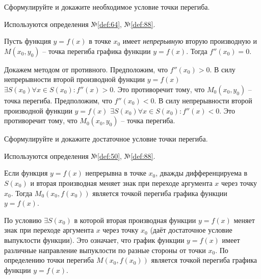 \begin{question}
    Сформулируйте и докажите необходимое условие точки перегиба.
\end{question}
\begin{used}
    Используются определения №\ref{def:64}, №\ref{def:88}.
\end{used}
\begin{theorem}
    Пусть функция $y = f(x)$ в точке $x_0$ имеет \textit{непрерывную} вторую производную и $M(x_0, y_0)$ -- точка перегиба графика функции $y = f(x)$. Тогда $f''(x_0) = 0$.
\end{theorem}
\begin{necessity}
    Докажем методом от противного. 
    Предположим, что $f''(x_0) > 0$. В силу непрерывности второй производной функции  $y = f(x)$ $\exists  S(x_0) \forall  x \in S(x_0) : f''(x) > 0$. Это противоречит тому, что $M_0(x_0, y_0)$ -- точка перегиба.
    Предположим, что $f''(x_0) < 0$. В силу непрерывности второй производной функции  $y = f(x)$ $\exists  S(x_0) \forall  x \in S(x_0) : f''(x) < 0$. Это противоречит тому, что $M_0(x_0, y_0)$ -- точка перегиба.
\end{necessity}
\pagebreak



\begin{question}
    Сформулируйте и докажите достаточное условие точки перегиба.
\end{question}
\begin{used}
    Используются определения №\ref{def:50}, №\ref{def:88}.
\end{used}
\begin{theorem}
    Если функция $y = f(x)$ непрерывна в точке $x_0$, дважды дифференцируема в $S(x_0)$ и вторая производная меняет знак при переходе аргумента $x$ через точку $x_0$. Тогда $M_0(x_0, f(x_0))$ является точкой перегиба графика функции $y = f(x)$.
\end{theorem}
\begin{sufficiency}
    По условию $\exists S(x_0)$ в которой вторая производная функции $y = f(x)$ меняет знак при переходе аргумента $x$ через точку $x_0$ (даёт достаточное условие выпуклости функции).
    Это означает, что график функции $y = f(x)$ имеет различные направление выпуклости по разные стороны от точки $x_0$.
    По определению точки перегиба $M(x_0, f(x_0))$ является точкой перегиба графика функции $y = f(x)$.
\end{sufficiency}
\pagebreak
